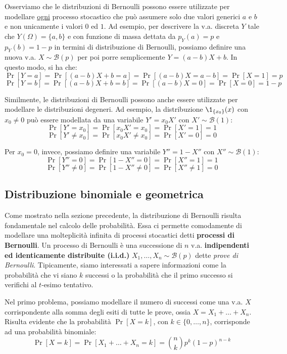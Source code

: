 \documentclass[a4paper, 12pt]{report}
\begin{document}
    Osserviamo che le distribuzioni di Bernoulli possono essere utilizzate per modellare \underline{ogni} processo stocastico che può assumere solo due valori generici $a$ e $b$ e non unicamente i valori $0$ ed $1$. Ad esempio, per descrivere la v.a. discreta $Y$ tale che $Y(\Omega) = \{a,b\}$ e con funzione di massa dettata da $p_Y(a) = p$ e $p_Y(b) = 1-p$ in termini di distribuzione di Bernoulli, possiamo definire una nuova v.a. $X \sim \mathcal{B}(p)$ per poi porre semplicemente $Y = (a-b)X + b$. In questo modo, si ha che:
    \[\Pr[Y = a] = \Pr[(a-b)X + b = a] = \Pr[(a-b)X = a-b] = \Pr[X = 1] = p\]
    \[\Pr[Y = b] = \Pr[(a-b)X + b = b] = \Pr[(a-b)X = 0] = \Pr[X = 0] = 1-p\]

    Similmente, le distribuzioni di Bernoulli possono anche essere utilizzate per modellare le distribuzioni degeneri. Ad esempio, la distribuzione $\1_{\{x_0\}}(x)$ con $x_0 \neq 0$ può essere modellata da una variabile $Y' = x_0X'$ con $X' \sim \mathcal{B}(1)$:
    \[\Pr[Y' = x_0] = \Pr[x_0X' = x_0] = \Pr[X' = 1] = 1\]
    \[\Pr[Y' \neq x_0] = \Pr[x_0X' \neq x_0] = \Pr[X' = 0] = 0\]

    Per $x_0 = 0$, invece, possiamo definire una variabile $Y'' = 1-X''$ con $X'' \sim \mathcal{B}(1)$:
    \[\Pr[Y'' = 0] = \Pr[1-X'' = 0] = \Pr[X'' = 1] = 1\]
    \[\Pr[Y'' \neq 0] = \Pr[1-X'' \neq 0] = \Pr[X'' \neq 1] = 0\]

    \subsection{Distribuzione binomiale e geometrica}

    Come mostrato nella sezione precedente, la distribuzione di Bernoulli risulta fondamentale nel calcolo delle probabilità. Essa ci permette comodamente di modellare una molteplicità infinita di processi stocastici detti \textbf{processi di Bernoulli}. Un processo di Bernoulli è una successione di $n$ v.a. \textbf{indipendenti ed identicamente distribuite (i.i.d.)} $X_1, \ldots, X_n \sim \mathcal{B}(p)$ dette \textit{prove di Bernoulli}. Tipicamente, siamo interessati a sapere informazioni come la probabilità che vi siano $k$ successi o la probabilità che il primo successo si verifichi al $t$-esimo tentativo.
    
    Nel primo problema, possiamo modellare il numero di successi come una v.a. $X$ corrispondente alla somma degli esiti di tutte le prove, ossia $X = X_1 + \ldots + X_n$.  Risulta evidente che la probabilità $\Pr[X = k]$, con $k \in \{0, \ldots, n\}$, corrisponde ad una probabilità binomiale:
    \[\Pr[X = k] = \Pr[X_1 + \ldots + X_n = k] = \binom{n}{k} p^k (1-p)^{n-k}\]
\end{document}

